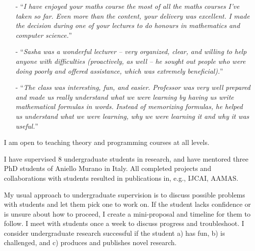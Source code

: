 \documentclass[10,a4paper,sans]{moderncv}
\begin{document}
\begin{itemize}
\item[-] ``\emph{I have enjoyed your maths course the most of all the maths courses I've taken so far. Even more than the content, your delivery was excellent.
I made the decision during one of your lectures to do honours in mathematics and computer science.}''

\item[-] ``\emph{Sasha was a wonderful lecturer -- very organized, clear, and willing to help anyone with difficulties (proactively, as well -- he sought out people who were doing poorly and offered assistance, which was extremely beneficial).}''

\item[-] ``\emph{The class was interesting, fun, and easier. Professor was very well prepared and made us really understand what we were learning by having us write mathematical formulas in words. Instead of memorizing formulas, he helped us understand what we were learning, why we were learning it and why it was useful.}''
\end{itemize}

I am open to teaching theory and programming courses at all levels. 


I have supervised 8 undergraduate students in research, and have mentored three PhD students of Aniello Murano in Italy. All completed projects and collaborations with students resulted in publications in, e.g., IJCAI, AAMAS.

My usual approach to undergraduate supervision is to discuss possible problems with students and let them pick one to work on. 
If the student lacks confidence or is unsure about how to proceed, I create a mini-proposal and timeline for them to follow. I meet with students once a week to discuss progress and troubleshoot. I consider undergraduate research successful if the student a) has fun, b) is challenged, and c) produces and publishes novel research.
\end{document}
